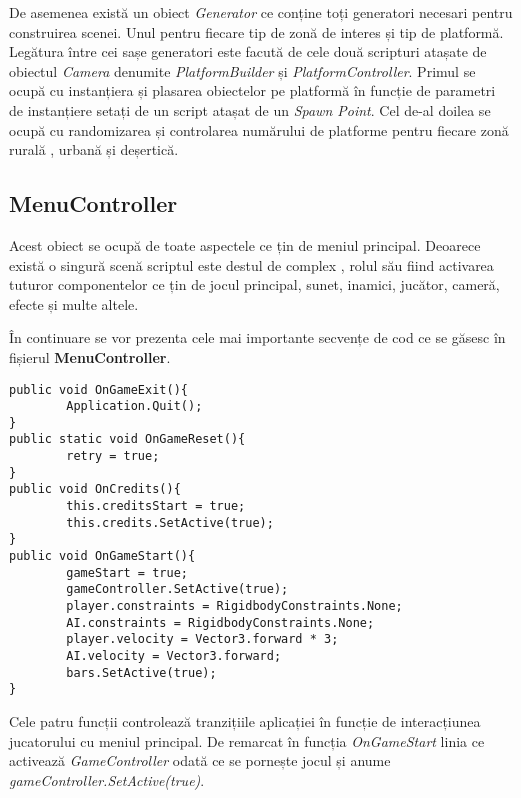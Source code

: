 De asemenea există un obiect \textit{Generator} ce conține toți generatori necesari pentru construirea scenei. Unul pentru fiecare tip de zonă de interes și tip de platformă. Legătura între cei sașe generatori este facută de cele două scripturi atașate de obiectul \textit{Camera} denumite \textit{PlatformBuilder} și \textit{PlatformController}. Primul se ocupă cu instanțiera și plasarea obiectelor pe platformă în funcție de parametri de instanțiere setați de un script atașat de un \textit{Spawn Point}. Cel de-al doilea se ocupă cu randomizarea și controlarea numărului de platforme pentru fiecare zonă rurală , urbană și deșertică.\par
\par

\subsection{MenuController}

Acest obiect se ocupă de toate aspectele ce țin de meniul principal. Deoarece există o singură scenă scriptul este destul de complex , rolul său fiind activarea tuturor componentelor ce țin de jocul principal, sunet, inamici, jucător, cameră, efecte și multe altele.\par

În continuare se vor prezenta cele mai importante secvențe de cod ce se găsesc în fișierul \textbf{MenuController}.\par

\begin{lstlisting}[caption=Funcțiile din MenuController]
public void OnGameExit(){
        Application.Quit();
}
public static void OnGameReset(){
        retry = true;
}
public void OnCredits(){
        this.creditsStart = true;
        this.credits.SetActive(true);
}
public void OnGameStart(){
        gameStart = true;
        gameController.SetActive(true);
        player.constraints = RigidbodyConstraints.None;
        AI.constraints = RigidbodyConstraints.None;
        player.velocity = Vector3.forward * 3;
        AI.velocity = Vector3.forward;
        bars.SetActive(true);
}
\end{lstlisting}

Cele patru funcții controlează tranzițiile aplicației în funcție de interacțiunea jucatorului cu meniul principal. De remarcat în funcția \textit{OnGameStart} linia ce activează \textit{GameController} odată ce se pornește jocul și anume \textit{gameController.SetActive(true)}.\par

